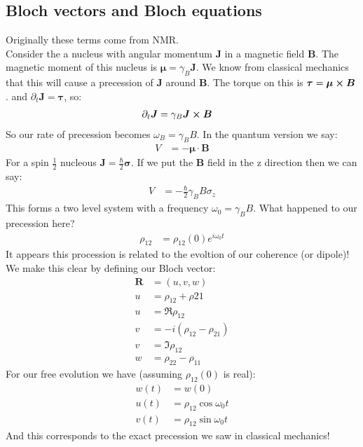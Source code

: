 \subsection{Bloch vectors and Bloch equations}
Originally these terms come from NMR.\\
Consider the a nucleus with angular momentum $\bm{J}$ in a magnetic field $\bm{B}$. The magnetic moment of this nucleus is $\bm{\mu} = \gamma_B \bm{J}$. We know from classical mechanics that this will cause a precession of $\bm{J}$ around $\bm{B}$.
The torque on this is $\bm{\tau} = \bm{\mu}\cross\bm{B}$. and $\partial_t \bm{J} = \bm{\tau}$, so:
\begin{align*}
	\partial_t \bm{J} &= \gamma_B \bm{J}\cross\bm{B}
\end{align*}
So our rate of precession becomes $\omega_B = \gamma_B B$. In the quantum version we say:
\begin{align*}
	V &= -\bm{\mu}\cdot\bm{B}
\end{align*}
For a spin $\frac{1}{2}$ nucleous $\bm{J} = \frac{\hbar}{2}\bm{\sigma}$. If we put the $\bm{B}$ field in the z direction then we can say:
\begin{align*}
	V &= -\frac{\hbar}{2}\gamma_B B \sigma_z
\end{align*}
This forms a two level system with a frequency $\omega_0 = \gamma_B B$. What happened to our precession here?
\begin{align*}
	\rho_{12} &= \rho_{12}(0) e^{i\omega_0 t}
\end{align*}
It appears this procession is related to the evoltion of our coherence (or dipole)! \\
We make this clear by defining our Bloch vector:
\begin{align*}
	\bm{R} &= (u,v,w) \\
	u &= \rho_{12} + \rho{21} \\
	u &= \Re \rho_{12} \\
	v &= -i(\rho_{12} -\rho_{21}) \\
	v &= \Im\rho_{12} \\
	w &= \rho_{22} - \rho_{11}
\end{align*}
For our free evolution we have (assuming $\rho_{12}(0)$ is real):
\begin{align*}
	w(t) &= w(0) \\
	u(t) &= \rho_{12} \cos\omega_0 t \\
	v(t) &= \rho_{12} \sin\omega_0 t
\end{align*}
And this corresponds to the exact precession we saw in classical mechanics! \\
